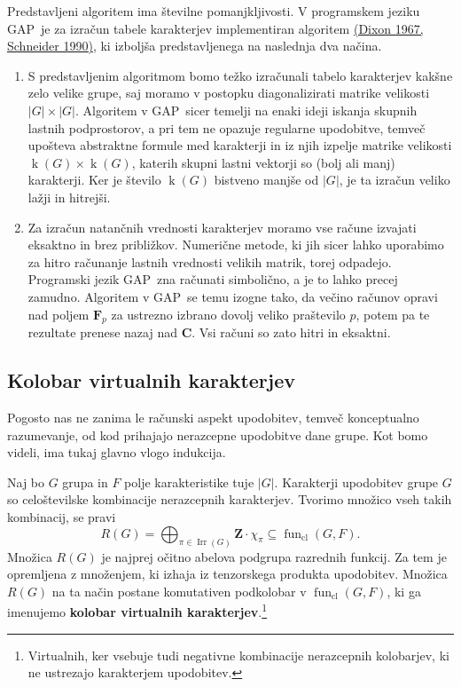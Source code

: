 \documentclass[11pt]{book}
\def\ZZ{\mathbf{Z}}
\def\CC{\mathbf{C}}
\def\FF{\mathbf{F}}
\DeclareMathOperator\Irr{Irr}
\DeclareMathOperator\kk{k}
\DeclareMathOperator\cl{cl}
\DeclareMathOperator\fun{fun}
\def\definicija{\color{rdeca}\bf}
\theoremstyle{definition}
\theoremstyle{zgled}
\theoremstyle{zgledbrezstevilke}
\theoremstyle{odprtproblem}
\theoremstyle{domacanaloga}
\theoremstyle{izrek}
\begin{document}
Predstavljeni algoritem ima številne pomanjkljivosti. V programskem jeziku GAP~je za izračun tabele karakterjev implementiran algoritem \href{https://www.sciencedirect.com/science/article/pii/S0747717108800776}{(Dixon 1967, Schneider 1990)}, ki izboljša predstavljenega na naslednja dva načina.
\begin{enumerate}
    \item S predstavljenim algoritmom bomo težko izračunali tabelo karakterjev kakšne zelo velike grupe, saj moramo v postopku diagonalizirati matrike velikosti $|G| \times |G|$. Algoritem v GAP~sicer temelji na enaki ideji iskanja skupnih lastnih podprostorov, a pri tem ne opazuje regularne upodobitve, temveč upošteva abstraktne formule med karakterji in iz njih izpelje matrike velikosti $\kk(G) \times \kk(G)$, katerih skupni lastni vektorji so (bolj ali manj) karakterji. Ker je število $\kk(G)$ bistveno manjše od $|G|$, je ta izračun veliko lažji in hitrejši.
    
    \item Za izračun natančnih vrednosti karakterjev moramo vse račune izvajati eksaktno in brez približkov. Numerične metode, ki jih sicer lahko uporabimo za hitro računanje lastnih vrednosti velikih matrik, torej odpadejo. Programski jezik GAP~zna računati simbolično, a je to lahko precej zamudno. Algoritem v GAP~se temu izogne tako, da večino računov opravi nad poljem $\FF_p$ za ustrezno izbrano dovolj veliko praštevilo $p$, potem pa te rezultate prenese nazaj nad $\CC$. Vsi računi so zato hitri in eksaktni.
\end{enumerate}

\subsection{Kolobar virtualnih karakterjev}

Pogosto nas ne zanima le računski aspekt upodobitev, temveč konceptualno razumevanje, od kod prihajajo nerazcepne upodobitve dane grupe. Kot bomo videli, ima tukaj glavno vlogo indukcija.

Naj bo $G$ grupa in $F$ polje karakteristike tuje $|G|$. Karakterji upodobitev grupe $G$ so celoštevilske kombinacije nerazcepnih karakterjev. Tvorimo množico vseh takih kombinacij, se pravi
\[
    R(G) = \bigoplus_{\pi \in \Irr(G)} \ZZ \cdot \chi_{\pi} \subseteq \textstyle \fun_{\cl}(G, F).
\]  
Množica $R(G)$ je najprej očitno abelova podgrupa razrednih funkcij. Za tem je opremljena z množenjem, ki izhaja iz tenzorskega produkta upodobitev. Množica $R(G)$ na ta način postane komutativen podkolobar v $\fun_{\cl}(G,F)$, ki ga imenujemo {\definicija kolobar virtualnih karakterjev}.\footnote{Virtualnih, ker vsebuje tudi negativne kombinacije nerazcepnih kolobarjev, ki ne ustrezajo karakterjem upodobitev.}
\end{document}
